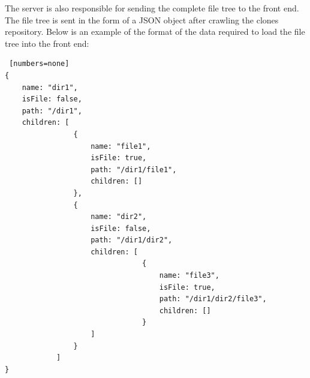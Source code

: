 The server is also responsible for sending the complete file tree to the front end. The file tree is sent in the form of a JSON object after crawling the clones repository. Below is an example of the format of the data required to load the file tree into the front end:
\begin{lstlisting} [numbers=none]
{
    name: "dir1", 
    isFile: false, 
    path: "/dir1", 
    children: [
                {
                    name: "file1", 
                    isFile: true, 
                    path: "/dir1/file1", 
                    children: []
                },
                {
                    name: "dir2", 
                    isFile: false, 
                    path: "/dir1/dir2", 
                    children: [
                                {
                                    name: "file3", 
                                    isFile: true, 
                                    path: "/dir1/dir2/file3", 
                                    children: []
                                }  
                    ]
                }
            ]
}
\end{lstlisting}

